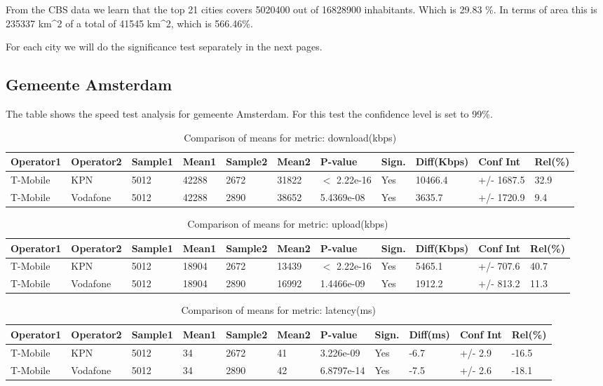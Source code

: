 \documentclass[]{article}
\begin{document}
From the CBS data we learn that the top 21 cities covers 5020400 out of
16828900 inhabitants. Which is 29.83 \%. In terms of area this is 235337
km\^{}2 of a total of 41545 km\^{}2, which is 566.46\%.

For each city we will do the significance test separately in the next
pages.

\newpage

\subsection{Gemeente Amsterdam}\label{gemeente-amsterdam}

The table shows the speed test analysis for gemeente Amsterdam. For this
test the confidence level is set to 99\%.

\begin{table}[ht]
\centering
{\footnotesize
\begin{tabular}{lllllllllll}
  \hline
Operator1 & Operator2 & Sample1 & Mean1 & Sample2 & Mean2 & P-value & Sign. & Diff(Kbps) & Conf Int & Rel(\%) \\ 
  \hline
T-Mobile & KPN & 5012 & 42288 & 2672 & 31822 & $<$ 2.22e-16 & Yes & 10466.4 & +/- 1687.5 & 32.9 \\ 
  T-Mobile & Vodafone & 5012 & 42288 & 2890 & 38652 & 5.4369e-08 & Yes & 3635.7 & +/- 1720.9 & 9.4 \\ 
   \hline
\end{tabular}
}
\caption{Comparison of means for metric: download(kbps)} 
\end{table}\begin{table}[ht]
\centering
{\footnotesize
\begin{tabular}{lllllllllll}
  \hline
Operator1 & Operator2 & Sample1 & Mean1 & Sample2 & Mean2 & P-value & Sign. & Diff(Kbps) & Conf Int & Rel(\%) \\ 
  \hline
T-Mobile & KPN & 5012 & 18904 & 2672 & 13439 & $<$ 2.22e-16 & Yes & 5465.1 & +/- 707.6 & 40.7 \\ 
  T-Mobile & Vodafone & 5012 & 18904 & 2890 & 16992 & 1.4466e-09 & Yes & 1912.2 & +/- 813.2 & 11.3 \\ 
   \hline
\end{tabular}
}
\caption{Comparison of means for metric: upload(kbps)} 
\end{table}\begin{table}[ht]
\centering
{\footnotesize
\begin{tabular}{lllllllllll}
  \hline
Operator1 & Operator2 & Sample1 & Mean1 & Sample2 & Mean2 & P-value & Sign. & Diff(ms) & Conf Int & Rel(\%) \\ 
  \hline
T-Mobile & KPN & 5012 & 34 & 2672 & 41 & 3.226e-09 & Yes & -6.7 & +/- 2.9 & -16.5 \\ 
  T-Mobile & Vodafone & 5012 & 34 & 2890 & 42 & 6.8797e-14 & Yes & -7.5 & +/- 2.6 & -18.1 \\ 
   \hline
\end{tabular}
}
\caption{Comparison of means for metric: latency(ms)} 
\end{table}
\end{document}
